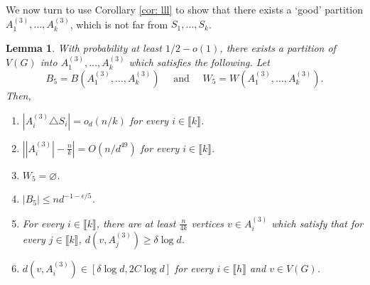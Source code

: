 \documentclass[notitlepage]{scrartcl}
\newcommand{\br}[1]{\llbracket{#1}\rrbracket}
\newtheorem{lemma}[thm]{Lemma}
\begin{document}
We now turn to use Corollary \ref{cor: lll} to show that there exists a `good' partition $A_1^{(3)},\ldots, A_k^{(3)}$, which is not far from $S_1,\ldots, S_k$.
\begin{lemma}\label{l: third lll}
With probability at least $1/2-o(1)$, there exists a partition of $V(G)$ into $A_1^{(3)},\ldots, A_k^{(3)}$ which satisfies the following. Let 
$$
B_5=B\left(A_1^{(3)},\ldots, A_k^{(3)}\right)
\quad\text{ and }\quad
W_5=W\left(A_1^{(3)},\ldots, A_k^{(3)}\right).
$$
Then,
\begin{enumerate}
    \item $\left|A_i^{(3)}\triangle S_i\right|=o_d(n/k)$ for every $i\in \br{k}$.\label{l: item third lll}
    \item $\left||A_i^{(3)}|-\frac{n}{k}\right|=O(n/d^{49})$ for every $i\in \br{k}$.
    \item $W_5=\varnothing$.
    \item $|B_5|\le nd^{-1-\epsilon/5}$.
    \item For every $i\in \br{k}$, there are at least $\frac{n}{4k}$ vertices $v \in A_i^{(3)}$ which satisfy that for every $j\in \br{k}$, $d(v,A_j^{(3)})\ge \delta\log d$. 
    \item $d(v, A_i^{(3)})\in \left[\delta \log d, 2C\log d\right]$ for every $i\in \br{h}$ and $v\in V(G)$.
\end{enumerate}
\end{lemma}
\end{document}
